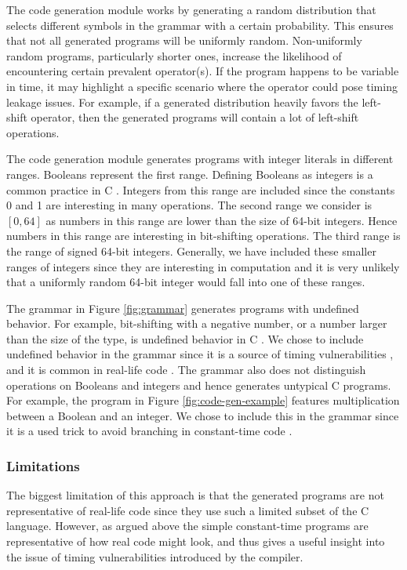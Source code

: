 The code generation module works by generating a random distribution that selects different symbols in the grammar with a certain probability.
This ensures that not all generated programs will be uniformly random. 
Non-uniformly random programs, particularly shorter ones, increase the likelihood of encountering certain prevalent operator(s).
If the program happens to be variable in time, it may highlight a specific scenario where the operator could pose timing leakage issues.
For example, if a generated distribution heavily favors the left-shift operator, then the generated programs will contain a lot of left-shift operations.

The code generation module generates programs with integer literals in different ranges. 
Booleans represent the first range.
Defining Booleans as integers is a common practice in C \citep{c-standard}.
Integers from this range are included since the constants 0 and 1 are interesting in many operations.
The second range we consider is $[0, 64]$ as numbers in this range are lower than the size of 64-bit integers.
Hence numbers in this range are interesting in bit-shifting operations.
The third range is the range of signed 64-bit integers.
Generally, we have included these smaller ranges of integers since they are interesting in computation and it is very unlikely that a uniformly random 64-bit integer would fall into one of these ranges.

The grammar in Figure \ref{fig:grammar} generates programs with undefined behavior.
For example, bit-shifting with a negative number, or a number larger than the size of the type, is undefined behavior in C \citep{c-standard}.
We chose to include undefined behavior in the grammar since it is a source of timing vulnerabilities \citep{what-you-c}, and it is common in real-life code \citep{undefined-behavior-c}.
The grammar also does not distinguish operations on Booleans and integers and hence generates untypical C programs.
For example, the program in Figure \ref{fig:code-gen-example} features multiplication between a Boolean and an integer.
We chose to include this in the grammar since it is a used trick to avoid branching in constant-time code \citep{what-you-c}.

\subsubsection{Limitations}
The biggest limitation of this approach is that the generated programs are not representative of real-life code since they use such a limited subset of the C language.
However, as argued above the simple constant-time programs are representative of how real code might look, and thus gives a useful insight into the issue of timing vulnerabilities introduced by the compiler.